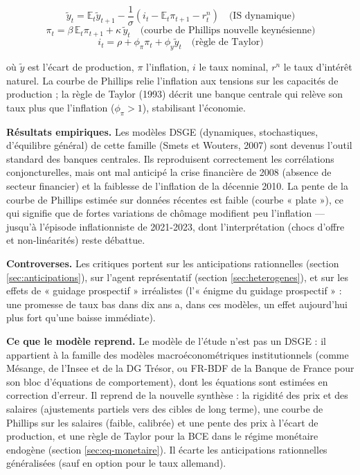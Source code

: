 \documentclass[
  11pt,
  11pt,
  a4paper,
  openany]{book}
\begin{document}
\[\tilde y_t = \mathbb{E}_t \tilde y_{t+1} - \frac{1}{\sigma}\left(i_t - \mathbb{E}_t \pi_{t+1} - r^n_t\right) \quad\text{(IS dynamique)}\]
\[\pi_t = \beta\,\mathbb{E}_t \pi_{t+1} + \kappa\,\tilde y_t \quad\text{(courbe de Phillips nouvelle keynésienne)}\]
\[i_t = \rho + \phi_\pi \pi_t + \phi_y \tilde y_t \quad\text{(règle de Taylor)}\]

où \(\tilde y\) est l'écart de production, \(\pi\) l'inflation, \(i\) le
taux nominal, \(r^n\) le taux d'intérêt naturel. La courbe de Phillips
relie l'inflation aux tensions sur les capacités de production ; la
règle de Taylor (1993) décrit une banque centrale qui relève son taux
plus que l'inflation (\(\phi_\pi > 1\)), stabilisant l'économie.

\textbf{Résultats empiriques.} Les modèles DSGE (dynamiques,
stochastiques, d'équilibre général) de cette famille (Smets et Wouters,
2007) sont devenus l'outil standard des banques centrales. Ils
reproduisent correctement les corrélations conjoncturelles, mais ont mal
anticipé la crise financière de 2008 (absence de secteur financier) et
la faiblesse de l'inflation de la décennie 2010. La pente de la courbe
de Phillips estimée sur données récentes est faible (courbe « plate »),
ce qui signifie que de fortes variations de chômage modifient peu
l'inflation --- jusqu'à l'épisode inflationniste de 2021-2023, dont
l'interprétation (chocs d'offre et non-linéarités) reste débattue.

\textbf{Controverses.} Les critiques portent sur les anticipations
rationnelles (section \ref{sec:anticipations}), sur l'agent
représentatif (section \ref{sec:heterogenes}), et sur les effets de «
guidage prospectif » irréalistes (l'« énigme du guidage prospectif » :
une promesse de taux bas dans dix ans a, dans ces modèles, un effet
aujourd'hui plus fort qu'une baisse immédiate).

\textbf{Ce que le modèle reprend.} Le modèle de l'étude n'est pas un
DSGE : il appartient à la famille des modèles macroéconométriques
institutionnels (comme Mésange, de l'Insee et de la DG Trésor, ou FR-BDF
de la Banque de France pour son bloc d'équations de comportement), dont
les équations sont estimées en correction d'erreur. Il reprend de la
nouvelle synthèse : la rigidité des prix et des salaires (ajustements
partiels vers des cibles de long terme), une courbe de Phillips sur les
salaires (faible, calibrée) et une pente des prix à l'écart de
production, et une règle de Taylor pour la BCE dans le régime monétaire
endogène (section \ref{sec:eq-monetaire}). Il écarte les anticipations
rationnelles généralisées (sauf en option pour le taux allemand).
\end{document}
